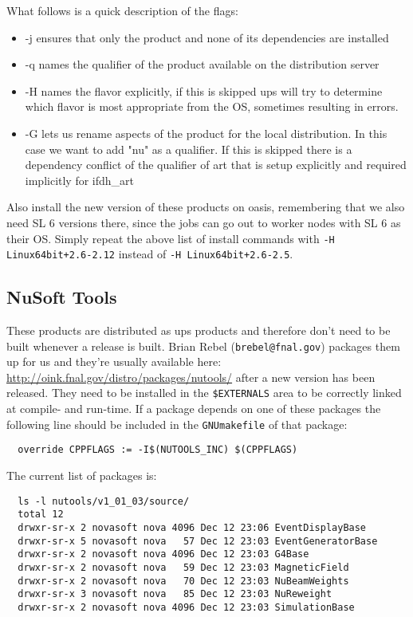 \documentclass[letterpaper,10pt]{article}
\begin{document}
What follows is a quick description of the flags:
\begin{itemize}
\item -j ensures that only the product and none of its dependencies are installed
\item -q names the qualifier of the product available on the distribution server
\item -H names the flavor explicitly, if this is skipped ups will try to determine which flavor is most appropriate from the OS, sometimes resulting in errors.
\item -G lets us rename aspects of the product for the local distribution. In this case we want to add "nu" as a qualifier. If this is skipped there is a dependency conflict of the qualifier of art that is setup explicitly and required implicitly for ifdh\_art
\end{itemize}

\noindent
Also install the new version of these products on oasis, remembering that we also need SL 6 versions there, since the jobs can go out to worker nodes with SL 6 as their OS. Simply repeat the above list of install commands with \verb|-H Linux64bit+2.6-2.12| instead of \verb|-H Linux64bit+2.6-2.5|.

\subsection{NuSoft Tools}

These products are distributed as ups products and therefore don't need to be built whenever a release is built. Brian Rebel (\verb|brebel@fnal.gov|) packages them up for us and they're usually available here:\\ \url{http://oink.fnal.gov/distro/packages/nutools/} after a new version has been released. They need to be installed in the \verb|$EXTERNALS| area to be correctly linked at compile- and run-time. If a package depends on one of these packages the following line should be included in the \verb|GNUmakefile| of that package:
\begin{verbatim}
  override CPPFLAGS := -I$(NUTOOLS_INC) $(CPPFLAGS)
\end{verbatim}

The current list of packages is:
\begin{verbatim}
  ls -l nutools/v1_01_03/source/
  total 12
  drwxr-sr-x 2 novasoft nova 4096 Dec 12 23:06 EventDisplayBase
  drwxr-sr-x 5 novasoft nova   57 Dec 12 23:03 EventGeneratorBase
  drwxr-sr-x 2 novasoft nova 4096 Dec 12 23:03 G4Base
  drwxr-sr-x 2 novasoft nova   59 Dec 12 23:03 MagneticField
  drwxr-sr-x 2 novasoft nova   70 Dec 12 23:03 NuBeamWeights
  drwxr-sr-x 3 novasoft nova   85 Dec 12 23:03 NuReweight
  drwxr-sr-x 2 novasoft nova 4096 Dec 12 23:03 SimulationBase
\end{verbatim}
\end{document}
